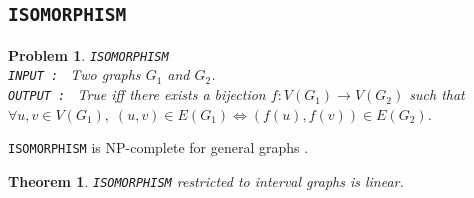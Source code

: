 \documentclass{article}
\newtheorem{theorem}{Theorem}[section]
\newtheorem{problem}{Problem}[section]
\begin{document}
\subsection{\texttt{ISOMORPHISM}}

\begin{problem}
    \texttt{ISOMORPHISM} \\
    \texttt{INPUT : } Two graphs $G_1$ and $G_2$.\\
    \texttt{OUTPUT : } True iff there exists a bijection $f : V(G_1) \rightarrow V(G_2)$ such that $\forall u,v \in V(G_1), \; (u,v) \in E(G_1) \Leftrightarrow (f(u),f(v)) \in E(G_2)$.
\end{problem}

\texttt{ISOMORPHISM} is NP-complete for general graphs \cite{karp}.

\begin{theorem}
    \texttt{ISOMORPHISM} restricted to interval graphs is linear.
\end{theorem}
\end{document}
